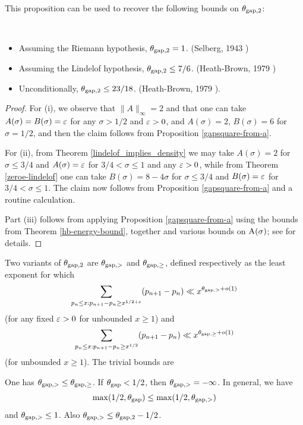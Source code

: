 

This proposition can be used to recover the following bounds on $\theta_{\mathrm{gap},2}$:

\begin{corollary}\
    \begin{itemize}
    \item[(i)] Assuming the Riemann hypothesis, $\theta_{\mathrm{gap},2} = 1$. (Selberg, 1943 \cite{selberg_1943})
    \item[(ii)] Assuming the Lindelof hypothesis, $\theta_{\mathrm{gap},2} \leq 7/6$. (Heath-Brown, 1979 \cite{heath_brown_consecutive_II})
    \item[(iii)] Unconditionally, $\theta_{\mathrm{gap},2} \leq 23/18$. (Heath-Brown, 1979 \cite{heath_brown_consecutive_III}).
\end{itemize}
\end{corollary}

\begin{proof} For (i), we observe that $\|A\|_\infty=2$ and that one can take $A(\sigma)=B(\sigma)=\varepsilon$ for any $\sigma>1/2$ and $\varepsilon>0$, and $A(\sigma)=2$, $B(\sigma)=6$ for $\sigma=1/2$, and then the claim follows from Proposition \ref{gapsquare-from-a}.

For (ii), from Theorem \ref{lindelof_implies_density} we may take $A(\sigma)=2$ for $\sigma \leq 3/4$ and $A(\sigma)=\varepsilon$ for $3/4 < \sigma \leq 1$ and any $\varepsilon>0$, while from Theorem \ref{zeroe-lindelof} one can take $B(\sigma) = 8-4\sigma$ for $\sigma \leq 3/4$ and $B(\sigma)=\varepsilon$ for $3/4 < \sigma \leq 1$.  The claim now follows from Proposition \ref{gapsquare-from-a} and a routine calculation.

Part (iii) follows from applying Proposition \ref{gapsquare-from-a} using the bounds from Theorem \ref{hb-energy-bound}, together and various bounds on $\mathrm{A}(\sigma)$; see \cite[Theorem 12.14]{ivic} for details.
\end{proof}

Two variants of $\theta_{\mathrm{gap},2}$ are $\theta_{\mathrm{gap},>}$ and $\theta_{\mathrm{gap},\geq}$, defined respectively as the least exponent for which
$$ \sum_{p_n \leq x: p_{n+1}-p_n \geq x^{1/2+\varepsilon}} (p_{n+1}-p_n) \ll x^{\theta_{\mathrm{gap},>}+o(1)}$$
(for any fixed $\varepsilon>0$ for unbounded $x \geq 1$) and
$$ \sum_{p_n \leq x: p_{n+1}-p_n \geq x^{1/2}} (p_{n+1}-p_n) \ll x^{\theta_{\mathrm{gap},\geq}+o(1)}$$
(for unbounded $x \geq 1$).  The trivial bounds are

\begin{proposition}\label{trivial-large-gap}  One has $\theta_{\mathrm{gap},>} \le \theta_{\mathrm{gap},\geq}$. If $\theta_{\mathrm{gap}} < 1/2$, then $\theta_{\mathrm{gap},>} = -\infty$.  In general, we have
    $$ \max(1/2,\theta_{\mathrm{gap}}) \leq \max(1/2, \theta_{\mathrm{gap},>})$$
    and $\theta_{\mathrm{gap},>} \leq 1$.  Also $\theta_{\mathrm{gap},>} \leq \theta_{\mathrm{gap},2} - 1/2$.
\end{proposition}

